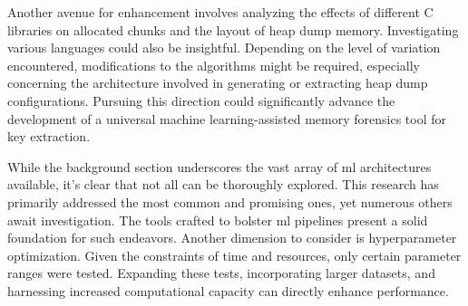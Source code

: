 Another avenue for enhancement involves analyzing the effects of different C libraries on allocated chunks and the layout of heap dump memory. Investigating various languages could also be insightful. Depending on the level of variation encountered, modifications to the algorithms might be required, especially concerning the architecture involved in generating or extracting heap dump configurations. Pursuing this direction could significantly advance the development of a universal machine learning-assisted memory forensics tool for key extraction.

While the background section underscores the vast array of \acrshort{ml} architectures available, it's clear that not all can be thoroughly explored. This research has primarily addressed the most common and promising ones, yet numerous others await investigation. The tools crafted to bolster \acrshort{ml} pipelines present a solid foundation for such endeavors. Another dimension to consider is hyperparameter optimization. Given the constraints of time and resources, only certain parameter ranges were tested. Expanding these tests, incorporating larger datasets, and harnessing increased computational capacity can directly enhance performance.


